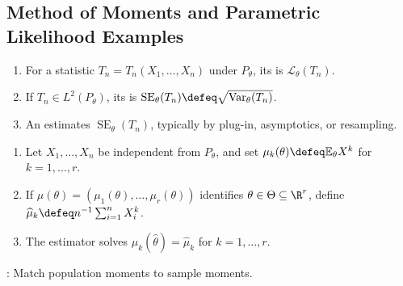 \subsection{Method of Moments and Parametric Likelihood Examples}

\begin{definition} \label{def:sampling-distribution-and-standard-error} 
\begin{enumerate}[label=(\roman*)]
\setlength{\itemsep}{0pt}
\item For a statistic $T_n=T_n(X_1,\ldots,X_n)$ under $P_\theta$, its  is $\mathcal{L}_\theta(T_n)$.
\item If $T_n\in L^2(P_\theta)$, its  is $\operatorname{SE}_\theta(T_n)\defeq\sqrt{\operatorname{Var}_\theta(T_n)}$.
\item An  estimates $\operatorname{SE}_\theta(T_n)$, typically by plug-in, asymptotics, or resampling.
\end{enumerate}
\end{definition}

\begin{method} \label{meth:method-of-moments} 
\begin{enumerate}[label=(\roman*)]
\setlength{\itemsep}{0pt}
\item Let $X_1,\ldots,X_n$ be independent from $P_\theta$, and set $\mu_k(\theta)\defeq\mathbb{E}_\theta X^k$ for $k=1,\ldots,r$.
\item If $\mu(\theta)=(\mu_1(\theta),\ldots,\mu_r(\theta))$ identifies $\theta\in\Theta\subseteq\R^r$, define $\widehat{\mu}_k\defeq n^{-1}\sum_{i=1}^{n}X_i^k$.
\item The  estimator solves $\mu_k(\widehat{\theta})=\widehat{\mu}_k$ for $k=1,\ldots,r$.
\end{enumerate}
: Match population moments to sample moments.
\end{method}

